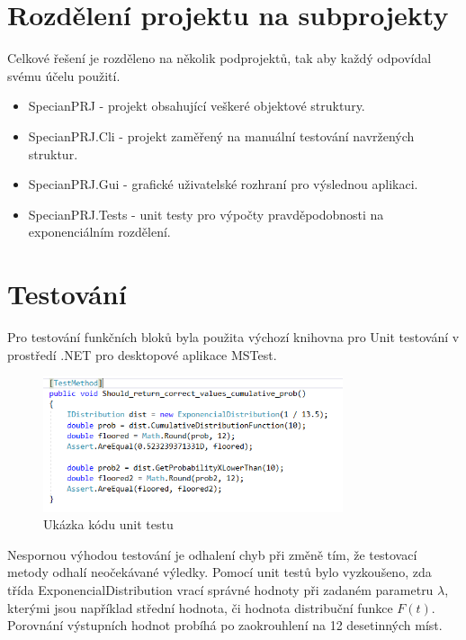 \documentclass[FM,RP]{tulthesis}
\begin{document}
    \section*{Rozdělení projektu na subprojekty}
        Celkové řešení je rozděleno na několik podprojektů, tak aby každý odpovídal svému účelu použití.
        \begin{itemize} 
        \item SpecianPRJ - projekt obsahující veškeré objektové struktury.
        \item SpecianPRJ.Cli - projekt zaměřený na manuální testování navržených struktur.
        \item SpecianPRJ.Gui - grafické uživatelské rozhraní pro výslednou aplikaci.
        \item SpecianPRJ.Tests - unit testy pro výpočty pravděpodobnosti na exponenciálním rozdělení.
        \end{itemize}

    \section*{Testování}
        Pro testování funkčních bloků byla použita výchozí knihovna pro Unit testování v prostředí .NET pro desktopové aplikace MSTest.
                \begin{figure}
            \begin{center}
                \includegraphics[width=250pt]{pic/testMethod.png}
                \caption{Ukázka kódu unit testu}
            \end{center}
        \end{figure}
        Nespornou výhodou testování je odhalení chyb při změně tím, že testovací metody odhalí neočekávané výledky.
        Pomocí unit testů bylo vyzkoušeno, zda třída ExponencialDistribution vrací správné hodnoty při zadaném parametru $ \lambda $, 
        kterými jsou například střední hodnota, či hodnota distribuční funkce $ F(t) $. Porovnání výstupních hodnot probíhá po zaokrouhlení na 12 desetinných míst.
\end{document}
